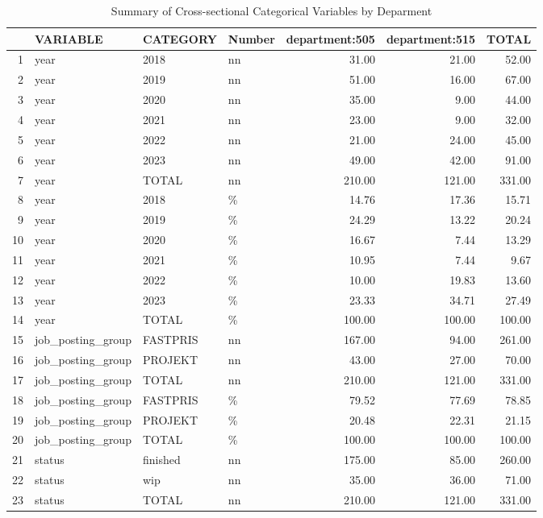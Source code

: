 \begin{sidewaystable}[ht]
\centering
\caption{Summary of Cross-sectional Categorical Variables by Deparment} 
\begin{tabular}{rlllrrr}
  \hline
 & VARIABLE & CATEGORY & Number & department:505 & department:515 & TOTAL \\ 
  \hline
1 & year & 2018 & nn & 31.00 & 21.00 & 52.00 \\ 
  2 & year & 2019 & nn & 51.00 & 16.00 & 67.00 \\ 
  3 & year & 2020 & nn & 35.00 & 9.00 & 44.00 \\ 
  4 & year & 2021 & nn & 23.00 & 9.00 & 32.00 \\ 
  5 & year & 2022 & nn & 21.00 & 24.00 & 45.00 \\ 
  6 & year & 2023 & nn & 49.00 & 42.00 & 91.00 \\ 
  7 & year & TOTAL & nn & 210.00 & 121.00 & 331.00 \\ 
  8 & year & 2018 & \% & 14.76 & 17.36 & 15.71 \\ 
  9 & year & 2019 & \% & 24.29 & 13.22 & 20.24 \\ 
  10 & year & 2020 & \% & 16.67 & 7.44 & 13.29 \\ 
  11 & year & 2021 & \% & 10.95 & 7.44 & 9.67 \\ 
  12 & year & 2022 & \% & 10.00 & 19.83 & 13.60 \\ 
  13 & year & 2023 & \% & 23.33 & 34.71 & 27.49 \\ 
  14 & year & TOTAL & \% & 100.00 & 100.00 & 100.00 \\ 
  15 & job\_posting\_group & FASTPRIS & nn & 167.00 & 94.00 & 261.00 \\ 
  16 & job\_posting\_group & PROJEKT & nn & 43.00 & 27.00 & 70.00 \\ 
  17 & job\_posting\_group & TOTAL & nn & 210.00 & 121.00 & 331.00 \\ 
  18 & job\_posting\_group & FASTPRIS & \% & 79.52 & 77.69 & 78.85 \\ 
  19 & job\_posting\_group & PROJEKT & \% & 20.48 & 22.31 & 21.15 \\ 
  20 & job\_posting\_group & TOTAL & \% & 100.00 & 100.00 & 100.00 \\ 
  21 & status & finished & nn & 175.00 & 85.00 & 260.00 \\ 
  22 & status & wip & nn & 35.00 & 36.00 & 71.00 \\ 
  23 & status & TOTAL & nn & 210.00 & 121.00 & 331.00 \\ 

\end{tabular}
\end{sidewaystable}
